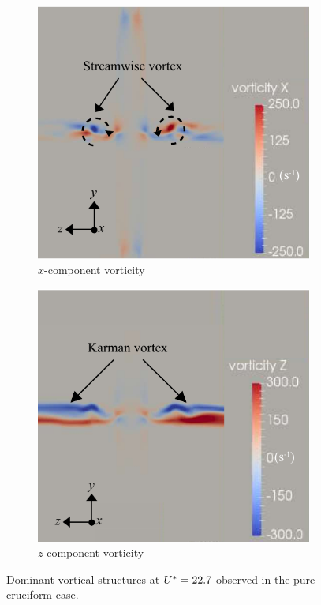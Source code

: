 \documentclass[oneside]{utmthesis}
\begin{document}
\begin{figure}[H]
  \centering
  \begin{subfigure}[h]{0.48\textwidth}
    \includegraphics[width=1\textwidth]{figs/vorx90}
    \caption{$x$-component vorticity}
    \label{fig:vorx90}
  \end{subfigure}
  \hfill
  \begin{subfigure}[h]{0.48\textwidth}
    \includegraphics[width=1\textwidth]{figs/vorz90}
    \caption{$z$-component vorticity}
    \label{fig:vorz90}
  \end{subfigure}

  \caption{Dominant vortical structures at $U^{*} = 22.7$ observed in the pure cruciform case.} \label{fig:vortStruct90}
\end{figure}
\end{document}

